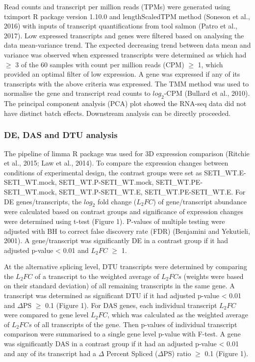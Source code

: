 \documentclass[]{article}
\begin{document}
Read counts and transcript per million reads (TPMs) were generated using
tximport R package version 1.10.0 and lengthScaledTPM method (Soneson et
al., 2016) with inputs of transcript quantifications from tool salmon
(Patro et al., 2017). Low expressed transcripts and genes were filtered
based on analysing the data mean-variance trend. The expected decreasing
trend between data mean and variance was observed when expressed
transcripts were determined as which had \(\geq\) 3 of the 60 samples
with count per million reads (CPM) \(\geq\) 1, which provided an optimal
filter of low expression. A gene was expressed if any of its transcripts
with the above criteria was expressed. The TMM method was used to
normalise the gene and transcript read counts to \(log_2\)-CPM (Bullard
et al., 2010). The principal component analysis (PCA) plot showed the
RNA-seq data did not have distinct batch effects. Downstream analysis
can be directly proceeded.

\subsubsection{DE, DAS and DTU analysis}\label{de-das-and-dtu-analysis}

The pipeline of limma R package was used for 3D expression comparison
(Ritchie et al., 2015; Law et al., 2014). To compare the expression
changes between conditions of experimental design, the contrast groups
were set as SETI\_WT.E-SETI\_WT.mock, SETI\_WT.P-SETI\_WT.mock,
SETI\_WT.PE-SETI\_WT.mock, SETI\_WT.P-SETI\_WT.E,
SETI\_WT.PE-SETI\_WT.E. For DE genes/transcripts, the \(log_2\) fold
change (\(L_2FC\)) of gene/transcript abundance were calculated based on
contrast groups and significance of expression changes were determined
using t-test (Figure 1). P-values of multiple testing were adjusted with
BH to correct false discovery rate (FDR) (Benjamini and Yekutieli,
2001). A gene/transcript was significantly DE in a contrast group if it
had adjusted p-value \textless{} 0.01 and \(L_2FC\) \(\geq\) 1.

At the alternative splicing level, DTU transcripts were determined by
comparing the \(L_2FC\) of a transcript to the weighted average of
\(L_2FCs\) (weights were based on their standard deviation) of all
remaining transcripts in the same gene. A transcript was determined as
significant DTU if it had adjusted p-value \textless{} 0.01 and
\(\Delta\)PS \(\geq\) 0.1 (Figure 1). For DAS genes, each individual
transcript \(L_2FC\) were compared to gene level \(L_2FC\), which was
calculated as the weighted average of \(L_2FCs\) of all transcripts of
the gene. Then p-values of individual transcript comparison were
summarised to a single gene level p-value with F-test. A gene was
significantly DAS in a contrast group if it had an adjusted p-value
\textless{} 0.01 and any of its transcript had a \(\Delta\) Percent
Spliced (\(\Delta\)PS) ratio \(\geq\) 0.1 (Figure 1).
\end{document}
